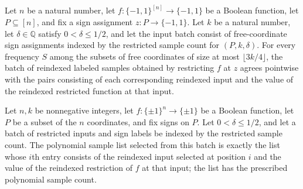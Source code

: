 \begin{theorem}
\label{FABL.lowDegreeJuntaCoefficientSamples_ideal}
\leanok
{}
Let $n$ be a natural number, let $f:\{-1,1\}^{[n]}\to\{-1,1\}$ be a Boolean function,
let $P\subseteq[n]$, and fix a sign assignment $z:P\to\{-1,1\}$. Let $k$ be a natural
number, let $\delta\in\mathbb{Q}$ satisfy $0<\delta\leq1/2$, and let the input batch
consist of free-coordinate sign assignments indexed by the restricted sample count for
$(P,k,\delta)$. For every frequency $S$ among the subsets of free coordinates of size at
most $\lfloor3k/4\rfloor$, the batch of reindexed labeled samples obtained by
restricting $f$ at $z$ agrees pointwise with the pairs consisting of each corresponding
reindexed input and the value of the reindexed restricted function at that input.
\end{theorem}

\begin{theorem}
\label{FABL.lowDegreeJuntaPolynomialSamples_ideal}
\leanok
{}
Let $n,k$ be nonnegative integers, let $f:\{\pm1\}^n\to\{\pm1\}$ be a Boolean function,
let $P$ be a subset of the $n$ coordinates, and fix signs on $P$. Let $0<\delta\le1/2$,
and let a batch of restricted inputs and sign labels be indexed by the restricted sample
count. The polynomial sample list selected from this batch is exactly the list whose
$i$th entry consists of the reindexed input selected at position $i$ and the value of
the reindexed restriction of $f$ at that input; the list has the prescribed polynomial
sample count.
\end{theorem}

